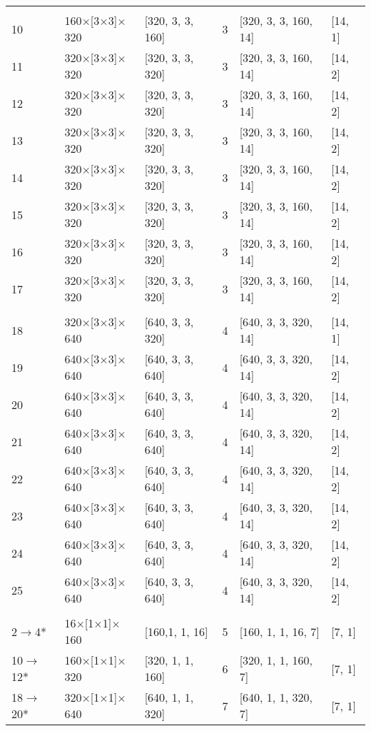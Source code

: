 \documentclass{article} \usepackage{iclr2021_conference,times}
\begin{document}
\begin{table}[htbp!]
{\begin{tabular}{@{}llllll@{}}
 &  &  &  &  &  \\ 
10 & 160$\times$[3$\times$3]$\times$320 & [320, 3, 3, 160] & 3 & [320, 3, 3, 160, 14] & [14, 1] \\ 
11 & 320$\times$[3$\times$3]$\times$320 & [320, 3, 3, 320] & 3 & [320, 3, 3, 160, 14] & [14, 2] \\ 
12 & 320$\times$[3$\times$3]$\times$320 & [320, 3, 3, 320] & 3 & [320, 3, 3, 160, 14] & [14, 2] \\ 
13 & 320$\times$[3$\times$3]$\times$320 & [320, 3, 3, 320] & 3 & [320, 3, 3, 160, 14] & [14, 2] \\ 
14 & 320$\times$[3$\times$3]$\times$320 & [320, 3, 3, 320] & 3 & [320, 3, 3, 160, 14] & [14, 2] \\ 
15 & 320$\times$[3$\times$3]$\times$320 & [320, 3, 3, 320] & 3 & [320, 3, 3, 160, 14] & [14, 2] \\ 
16 & 320$\times$[3$\times$3]$\times$320 & [320, 3, 3, 320] & 3 & [320, 3, 3, 160, 14] & [14, 2] \\ 
17 & 320$\times$[3$\times$3]$\times$320 & [320, 3, 3, 320] & 3 & [320, 3, 3, 160, 14] & [14, 2] \\ 
 &  &  &  &  &  \\ 
18 & 320$\times$[3$\times$3]$\times$640 & [640, 3, 3, 320] & 4 & [640, 3, 3, 320, 14] & [14, 1] \\ 
19 & 640$\times$[3$\times$3]$\times$640 & [640, 3, 3, 640] & 4 & [640, 3, 3, 320, 14] & [14, 2] \\ 
20 & 640$\times$[3$\times$3]$\times$640 & [640, 3, 3, 640] & 4 & [640, 3, 3, 320, 14] & [14, 2] \\ 
21 & 640$\times$[3$\times$3]$\times$640 & [640, 3, 3, 640] & 4 & [640, 3, 3, 320, 14] & [14, 2] \\ 
22 & 640$\times$[3$\times$3]$\times$640 & [640, 3, 3, 640] & 4 & [640, 3, 3, 320, 14] & [14, 2] \\ 
23 & 640$\times$[3$\times$3]$\times$640 & [640, 3, 3, 640] & 4 & [640, 3, 3, 320, 14] & [14, 2] \\ 
24 & 640$\times$[3$\times$3]$\times$640 & [640, 3, 3, 640] & 4 & [640, 3, 3, 320, 14] & [14, 2] \\ 
25 & 640$\times$[3$\times$3]$\times$640 & [640, 3, 3, 640] & 4 & [640, 3, 3, 320, 14] & [14, 2] \\ 
 &  &  &  &  &  \\ 
2$\rightarrow$4* & 16$\times$[1$\times$1]$\times$160 & [160,1, 1, 16] & 5 & [160, 1, 1, 16, 7] & [7, 1] \\ 
10$\rightarrow$12* & 160$\times$[1$\times$1]$\times$320 & [320, 1, 1, 160] & 6 & [320, 1, 1, 160, 7] & [7, 1] \\ 
18$\rightarrow$20* & 320$\times$[1$\times$1]$\times$640 & [640, 1, 1, 320] & 7 & [640, 1, 1, 320, 7] & [7, 1] \\
 \midrule
  \end{tabular}}
\end{table}
\end{document}
